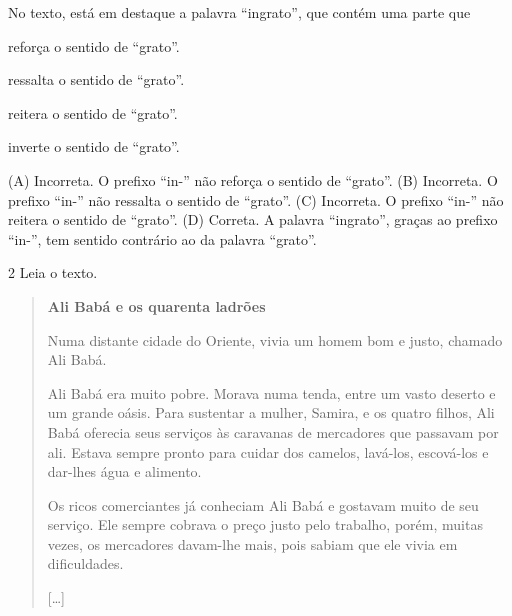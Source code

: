 No texto, está em destaque a palavra ``ingrato'', que contém uma parte que

\begin{escolha}
\item reforça o sentido de ``grato''.

\item ressalta o sentido de ``grato''.

\item reitera o sentido de ``grato''.

\item inverte o sentido de ``grato''.
\end{escolha}


(A) Incorreta. O prefixo ``in-'' não reforça o sentido de ``grato''.
(B) Incorreta. O prefixo ``in-'' não ressalta o sentido de ``grato''.
(C) Incorreta. O prefixo ``in-'' não reitera o sentido de ``grato''.
(D) Correta. A palavra ``ingrato'', graças ao prefixo ``in-'', tem sentido contrário ao da palavra ``grato''.

\num{2} Leia o texto.

\begin{quote}
\textbf{Ali Babá e os quarenta ladrões}

Numa distante cidade do Oriente, vivia um homem bom e justo, chamado Ali
Babá.

Ali Babá era muito pobre. Morava numa tenda, entre um vasto deserto e um
grande oásis. Para sustentar a mulher, Samira, e os quatro filhos, Ali
Babá oferecia seus serviços às caravanas de mercadores que passavam por
ali. Estava sempre pronto para cuidar dos camelos, lavá-los, escová-los
e dar-lhes água e alimento.

Os ricos comerciantes já conheciam Ali Babá e gostavam muito de seu
serviço. Ele sempre cobrava o preço justo pelo trabalho, porém, muitas
vezes, os mercadores davam-lhe mais, pois sabiam que ele vivia em
dificuldades.

{[}\ldots{}{]}

\end{quote}

